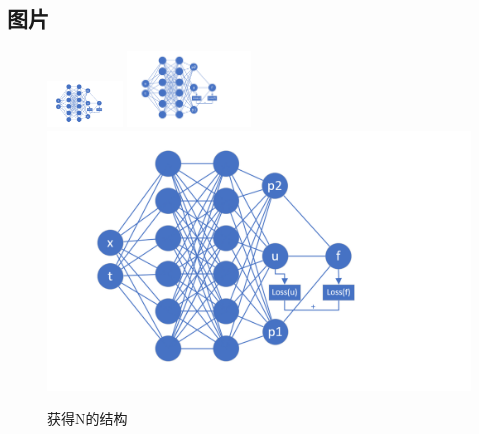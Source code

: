 \subsection{图片}
\begin{frame}
	\begin{figure}[h]
		\includegraphics[width=2cm]{./imags/flower.png}
		\includegraphics[height=2cm]{./imags/flower.png}
		\includegraphics[scale=0.1]{./imags/flower.png}
		\caption{获得N的结构}
	\end{figure}
\end{frame}


